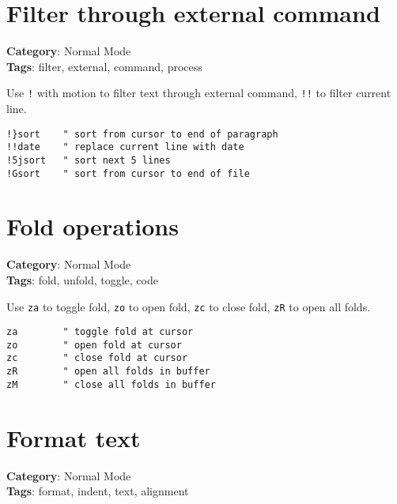 {{{{{{{{{{\section{Filter through external command}

\textbf{Category}: Normal Mode\\ \textbf{Tags}: filter, external, command, process
\vspace{0.5cm}

Use {\footnotesize \Verb§!§} with motion to filter text through external command, {\footnotesize \Verb§!!§} to filter current line.

\begin{Exa*}{}
\begin{Verbatim}[fontsize=\footnotesize, breaklines, breakanywhere]
!}sort    " sort from cursor to end of paragraph
!!date    " replace current line with date
!5jsort   " sort next 5 lines
!Gsort    " sort from cursor to end of file
\end{Verbatim}
\end{Exa*}

\section{Fold operations}

\textbf{Category}: Normal Mode\\ \textbf{Tags}: fold, unfold, toggle, code
\vspace{0.5cm}

Use {\footnotesize \Verb§za§} to toggle fold, {\footnotesize \Verb§zo§} to open fold, {\footnotesize \Verb§zc§} to close fold, {\footnotesize \Verb§zR§} to open all folds.

\begin{Exa*}{}
\begin{Verbatim}[fontsize=\footnotesize, breaklines, breakanywhere]
za        " toggle fold at cursor
zo        " open fold at cursor
zc        " close fold at cursor
zR        " open all folds in buffer
zM        " close all folds in buffer
\end{Verbatim}
\end{Exa*}

\section{Format text}

\textbf{Category}: Normal Mode\\ \textbf{Tags}: format, indent, text, alignment
\vspace{0.5cm}

}}}}}}}}}}
